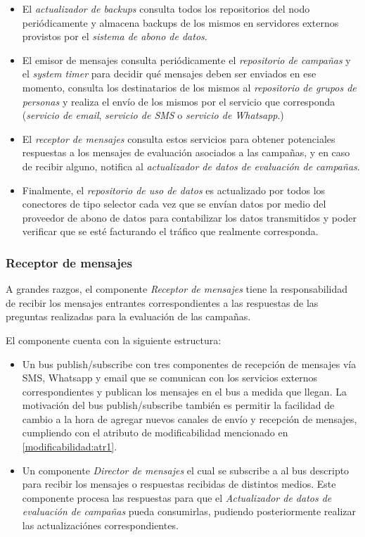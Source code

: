 \documentclass[a4paper, 10pt, twoside]{article}
\begin{document}
\begin{itemize}
  \item El \textit{actualizador de backups} consulta todos los repositorios del nodo periódicamente y almacena backups de los mismos en servidores externos provistos por el \textit{sistema de abono de datos}.

  \item El emisor de mensajes consulta periódicamente el \textit{repositorio de campañas} y el \textit{system timer} para decidir qué mensajes deben ser enviados en ese momento, consulta los destinatarios de los mismos al \textit{repositorio de grupos de personas} y realiza el envío de los mismos por el servicio que corresponda (\textit{servicio de email}, \textit{servicio de SMS} o \textit{servicio de Whatsapp}.)

  \item El \textit{receptor de mensajes} consulta estos servicios para obtener potenciales respuestas a los mensajes de evaluación asociados a las campañas, y en caso de recibir alguno, notifica al \textit{actualizador de datos de evaluación de campañas}.

  \item Finalmente, el \textit{repositorio de uso de datos} es actualizado por todos los conectores de tipo selector cada vez que se envían datos por medio del proveedor de abono de datos para contabilizar los datos transmitidos y poder verificar que se esté facturando el tráfico que realmente corresponda.
\end{itemize}


\subsubsection{Receptor de mensajes}

A grandes razgos, el componente \textit{Receptor de mensajes} tiene la responsabilidad de recibir los mensajes entrantes correspondientes a las respuestas de las preguntas realizadas para la evaluación de las campañas.

El componente cuenta con la siguiente estructura:

\begin{itemize}
  \item Un bus publish/subscribe con tres componentes de recepción de mensajes vía SMS, Whatsapp y email que se comunican con los servicios externos correspondientes y publican los mensajes en el bus a medida que llegan. La motivación del bus publish/subscribe también es permitir la facilidad de cambio a la hora de agregar nuevos canales de envío y recepción de mensajes, cumpliendo con el atributo de modificabilidad mencionado en \ref{modificabilidad:atr1}.

  \item Un componente \textit{Director de mensajes} el cual se subscribe a al bus descripto para recibir los mensajes o respuestas recibidas de distintos medios. Este componente procesa las respuestas para que el \textit{Actualizador de datos de evaluación de campañas} pueda consumirlas, pudiendo posteriormente realizar las actualizaciónes correspondientes.

\end{itemize}
\end{document}
